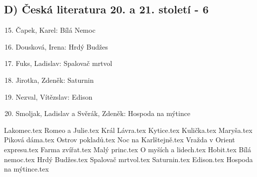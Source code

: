 \documentclass[11pt]{article}
\begin{document}
        \subsection*{D)	Česká literatura 20. a 21. století - 6}
            \begin{enumerate}
                \setcounter{enumi}{14}
                \item Čapek, Karel: Bílá Nemoc
                \item Dousková, Irena: Hrdý Budžes
                \item Fuks, Ladislav: Spalovač mrtvol
                \item Jirotka, Zdeněk: Saturnin
                \item Nezval, Vítězslav: Edison
                \item Smoljak, Ladislav a Svěrák, Zdeněk: Hospoda na mýtince
            \end{enumerate}

    \newpage
    {Lakomec.tex}
    \newpage
    {Romeo a Julie.tex}
    \newpage
    {Král Lávra.tex}
    \newpage
    {Kytice.tex}
    \newpage
    {Kulička.tex}
    \newpage
    {Maryša.tex}
    \newpage
    {Piková dáma.tex}
    \newpage
    {Ostrov pokladů.tex}
    \newpage
    {Noc na Karlštejně.tex}
    \newpage
    {Vražda v Orient expresu.tex}
    \newpage
    {Farma zvířat.tex}
    \newpage
    {Malý princ.tex}
    \newpage
    {O myších a lidech.tex}
    \newpage
    {Hobit.tex}
    \newpage
    {Bílá nemoc.tex}
    \newpage
    {Hrdý Budžes.tex}
    \newpage
    {Spalovač mrtvol.tex}
    \newpage
    {Saturnin.tex}
    \newpage
    {Edison.tex}
    \newpage
    {Hospoda na mýtince.tex}
    \newpage
\end{document}
